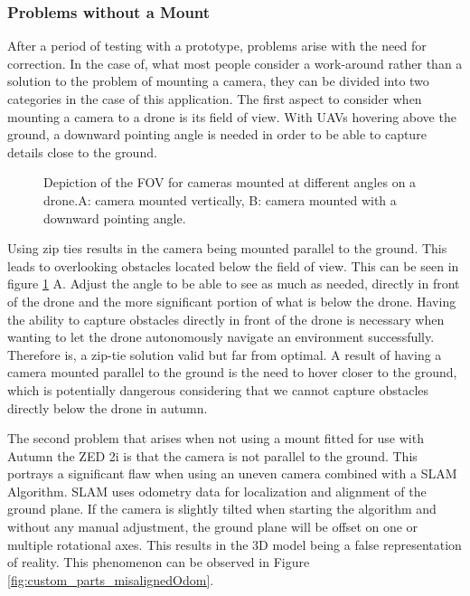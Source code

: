 \subsubsection{Problems without a Mount}

After a period of testing with a prototype, problems arise with the need for correction. In the case of, what most people consider a work-around rather than a solution to the problem of mounting a camera, they can be divided into two categories in the case of this application.
\newline The first aspect to consider when mounting a camera to a drone is its field of view. With UAVs hovering above the ground, a downward pointing angle is needed in order to be able to capture details close to the ground.  

\begin{figure}[h]
	\centering
	
	\caption{Depiction of the FOV for cameras mounted at different angles on a drone.\newline A: camera mounted vertically, B: camera mounted with a downward pointing angle.}
	\label{fig:custom_parts_FOV}
\end{figure}

Using zip ties results in the camera being mounted parallel to the ground. This leads to overlooking obstacles located below the field of view. This can be seen in figure \ref{fig:custom_parts_FOV} A. Adjust the angle to be able to see as much as needed, directly in front of the drone and the more significant portion of what is below the drone. Having the ability to capture obstacles directly in front of the drone is necessary when wanting to let the drone autonomously navigate an environment successfully. Therefore is, a zip-tie solution valid but far from optimal. A result of having a camera mounted parallel to the ground is the need to hover closer to the ground, which is potentially dangerous considering that we cannot capture obstacles directly below the drone in autumn.

The second problem that arises when not using a mount fitted for use with Autumn the ZED 2i is that the camera is not parallel to the ground. This portrays a significant flaw when using an uneven camera combined with a SLAM Algorithm. SLAM uses odometry data for localization and alignment of the ground plane. If the camera is slightly tilted when starting the algorithm and without any manual adjustment, the ground plane will be offset on one or multiple rotational axes. This results in the 3D model being a false representation of reality. This phenomenon can be observed in Figure \ref{fig:custom_parts_misalignedOdom}.

